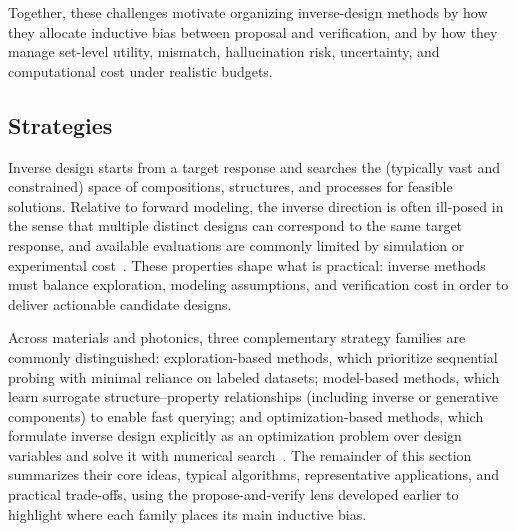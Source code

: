 Together, these challenges motivate organizing inverse-design methods by how they allocate inductive bias between proposal and verification, and by how they manage set-level utility, mismatch, hallucination risk, uncertainty, and computational cost under realistic budgets.


\subsection{Strategies}

Inverse design starts from a target response and searches the (typically vast and constrained) space of compositions, structures, and processes for feasible solutions. Relative to forward modeling, the inverse direction is often ill-posed in the sense that multiple distinct designs can correspond to the same target response, and available evaluations are commonly limited by simulation or experimental cost~\cite{KabanikhinSurvey}. These properties shape what is practical: inverse methods must balance exploration, modeling assumptions, and verification cost in order to deliver actionable candidate designs.

Across materials and photonics, three complementary strategy families are commonly distinguished: exploration-based methods, which prioritize sequential probing with minimal reliance on labeled datasets; model-based methods, which learn surrogate structure--property relationships (including inverse or generative components) to enable fast querying; and optimization-based methods, which formulate inverse design explicitly as an optimization problem over design variables and solve it with numerical search~\cite{Liu2025Review, Melati2025_InverseDesignPIC_Tutorial}. The remainder of this section summarizes their core ideas, typical algorithms, representative applications, and practical trade-offs, using the propose-and-verify lens developed earlier to highlight where each family places its main inductive bias.




